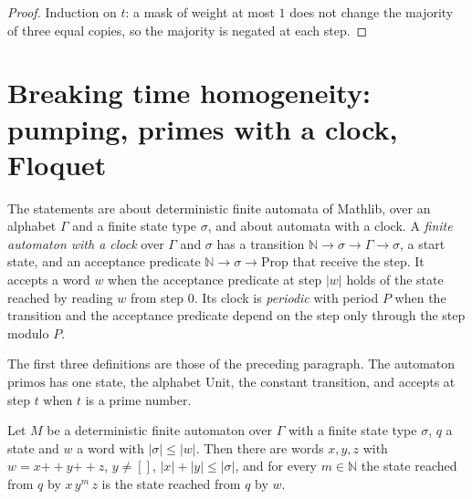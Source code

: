 \begin{proof}
  \leanok
  Induction on $t$: a mask of weight at most $1$ does not change the majority of three equal
  copies, so the majority is negated at each step.
\end{proof}

\section{Breaking time homogeneity: pumping, primes with a clock, Floquet}
\label{sec:dynamics-ruptures}

The statements are about deterministic finite automata of Mathlib, over an alphabet $\Gamma$ and a
finite state type $\sigma$, and about automata with a clock. A \emph{finite automaton with a clock}
over $\Gamma$ and $\sigma$ has a transition $\mathbb{N} \to \sigma \to \Gamma \to \sigma$, a start
state, and an acceptance predicate $\mathbb{N} \to \sigma \to \mathrm{Prop}$ that receive the step.
It accepts a word $w$ when the acceptance predicate at step $|w|$ holds of the state reached by
reading $w$ from step $0$. Its clock is \emph{periodic} with period $P$ when the transition and the
acceptance predicate depend on the step only through the step modulo $P$.

\begin{definition}
  \label{def:dynamics-dfa-clock}
  \leanok
  The first three definitions are those of the preceding paragraph. The automaton $\mathrm{primos}$
  has one state, the alphabet $\mathrm{Unit}$, the constant transition, and accepts at step $t$ when
  $t$ is a prime number.
  \own{}
\end{definition}

\begin{theorem}
  \label{thm:dynamics-pumping}
  \leanok
  Let $M$ be a deterministic finite automaton over $\Gamma$ with a finite state type $\sigma$, $q$
  a state and $w$ a word with $|\sigma| \le |w|$. Then there are words $x, y, z$ with
  $w = x \mathbin{+\!\!+} y \mathbin{+\!\!+} z$, $y \ne []$, $|x| + |y| \le |\sigma|$, and
  for every $m \in \mathbb{N}$ the state reached from $q$ by $x\, y^{m}\, z$ is the state reached
  from $q$ by $w$.
  \own{}
\end{theorem}

